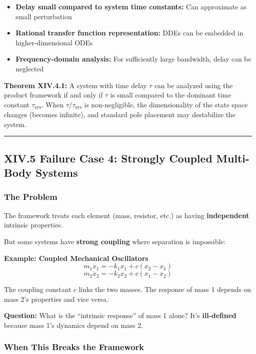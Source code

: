 \documentclass[
]{article}
\providecommand{\tightlist}{%
  \setlength{\itemsep}{0pt}\setlength{\parskip}{0pt}}
\begin{document}
\begin{itemize}
\tightlist
\item
  \textbf{Delay small compared to system time constants:} Can
  approximate as small perturbation
\item
  \textbf{Rational transfer function representation:} DDEs can be
  embedded in higher-dimensional ODEs
\item
  \textbf{Frequency-domain analysis:} For sufficiently large bandwidth,
  delay can be neglected
\end{itemize}

\textbf{Theorem XIV.4.1:} A system with time delay \(\tau\) can be
analyzed using the product framework if and only if \(\tau\) is small
compared to the dominant time constant \(\tau_{\text{sys}}\). When
\(\tau / \tau_{\text{sys}}\) is non-negligible, the dimensionality of
the state space changes (becomes infinite), and standard pole placement
may destabilize the system.

\begin{center}\rule{0.5\linewidth}{0.5pt}\end{center}

\subsection{XIV.5 Failure Case 4: Strongly Coupled Multi-Body
Systems}\label{xiv.5-failure-case-4-strongly-coupled-multi-body-systems}

\subsubsection{The Problem}\label{the-problem-3}

The framework treats each element (mass, resistor, etc.) as having
\textbf{independent} intrinsic properties.

But some systems have \textbf{strong coupling} where separation is
impossible:

\textbf{Example: Coupled Mechanical Oscillators}
\[m_1 \ddot{x}_1 = -k_1 x_1 + c(x_2 - x_1)\]
\[m_2 \ddot{x}_2 = -k_2 x_2 + c(x_1 - x_2)\]

The coupling constant \(c\) links the two masses. The response of mass 1
depends on mass 2's properties and vice versa.

\textbf{Question:} What is the ``intrinsic response'' of mass 1 alone?
It's \textbf{ill-defined} because mass 1's dynamics depend on mass 2.

\subsubsection{When This Breaks the
Framework}\label{when-this-breaks-the-framework}
\end{document}
